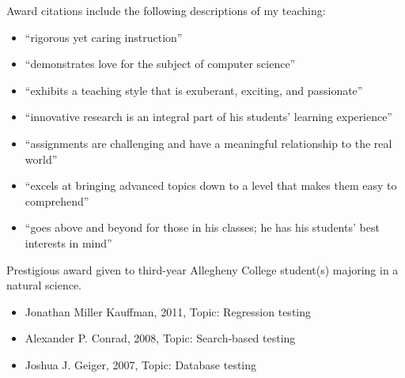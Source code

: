 \documentclass[11pt,letterpaper,sans]{moderncv}
\begin{document}

{Award citations include the following descriptions of my teaching: \vspace*{.025in}
  \begin{itemize}
    \renewcommand\labelitemi{\Large\textbullet}
    \item ``rigorous yet caring instruction''
    \item ``demonstrates love for the subject of computer science''
    \item ``exhibits a teaching style that is exuberant, exciting, and passionate''
    \item ``innovative research is an integral part of his students’ learning experience''
    \item ``assignments are challenging and have a meaningful relationship to the real world''
    \item ``excels at bringing advanced topics down to a level that makes them easy to comprehend''
    \item ``goes above and beyond for those in his classes; he has his students’ best interests in mind''
  \end{itemize}}


{Prestigious award given to third-year Allegheny College student(s) majoring in a natural science.\vspace*{.025in}
  \begin{itemize}
    \renewcommand\labelitemi{\Large\textbullet}
  \item Jonathan Miller Kauffman, 2011, Topic: Regression testing
  \item Alexander P. Conrad, 2008, Topic: Search-based testing
  \item Joshua J. Geiger, 2007, Topic: Database testing
\end{itemize}
\vspace*{.05in}
}
\end{document}
